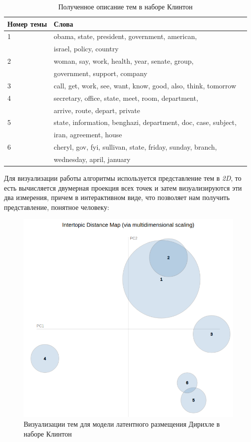 \begin{table}[H]
\centering
\begin{tabular}{ | l | l | l | }
\hline
Номер темы & Слова \\ \hline
1 & obama, state, president, government, american, \\ & israel,  policy, country \\ \hline
2 & woman, say, work, health, year, senate, group, \\ & government,  support, company \\ \hline
3 & call, get, work, see, want, know, good, also, think, tomorrow \\ \hline
4 & secretary, office, state, meet, room, department,  \\ &  arrive, route, depart, private \\ \hline 
5 & state, information, benghazi, department, doc, case, subject, \\ & iran, agreement, house \\ \hline
6 & cheryl, gov, fyi, sullivan, state, friday, sunday, branch,  \\ & wednesday, april, january \\ \hline 
\end{tabular}
\caption{Полученное описание тем в наборе Клинтон}
\end{table}


Для визуализации работы алгоритмы используется представление тем в
\textit{2D}, то есть вычисляется двумерная проекция всех точек и
затем визуализируются эти два измерения, причем в интерактивном виде, что
позволяет нам получить представление, понятное человеку:



\begin{figure}[H]
\centering
\includegraphics[scale=0.45]{pics/words_map.png}
\caption{Визуализации тем для модели латентного размещения Дирихле в наборе Клинтон}
\end{figure}
